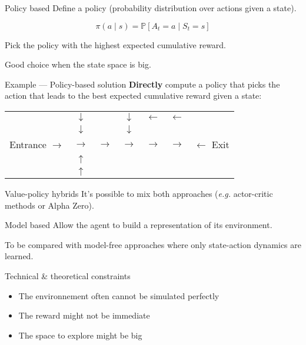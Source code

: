 \begin{frame}{Policy based}
  Define a policy (probability distribution over actions given a state).

  \[
    \pi(a \mid s) = \mathbb{P}[A_t = a \mid S_t = s]
  \]

  Pick the policy with the highest expected cumulative reward.

  Good choice when the state space is big.
\end{frame}

\begin{frame}{Example --- Policy-based solution}
  \textbf{Directly} compute a policy that picks the action that leads to the best expected cumulative reward given a state:

  \begin{tabular}{c|c|c|c|c|c|c}
    \cline{2-6}
      & $\downarrow$ & \cellcolor{black} & $\downarrow$ & $\leftarrow$ & $\leftarrow$ & \\
      \cline{2-6}
      & $\downarrow$ & \cellcolor{black} & $\downarrow$ & \cellcolor{black} & \cellcolor{black} & \\
      \cline{2-6}
      Entrance $\rightarrow$ & $\rightarrow$ & $\rightarrow$ & $\rightarrow$ & $\rightarrow$ & $\rightarrow$ & $\leftarrow$ Exit \\
      \cline{2-6}
      & $\uparrow$ & \cellcolor{black} & \cellcolor{black} & \cellcolor{black} & \cellcolor{black} & \\
      \cline{2-6}
      & $\uparrow$ & \cellcolor{black} & \cellcolor{black} & \cellcolor{black} & \cellcolor{black} & \\
      \cline{2-6}
  \end{tabular}
\end{frame}

\begin{frame}{Value-policy hybrids}
  It's possible to mix both approaches (\textit{e.g.} actor-critic methods or Alpha Zero).
\end{frame}

\begin{frame}{Model based}
  Allow the agent to build a representation of its environment.

  To be compared with model-free approaches where only state-action dynamics are learned.
\end{frame}

\begin{frame}{Technical \& theoretical constraints}
  \begin{itemize}[<+->]
    \item The environnement often cannot be simulated perfectly 
    \item The reward might not be immediate
    \item The space to explore might be big
  \end{itemize}
\end{frame}

